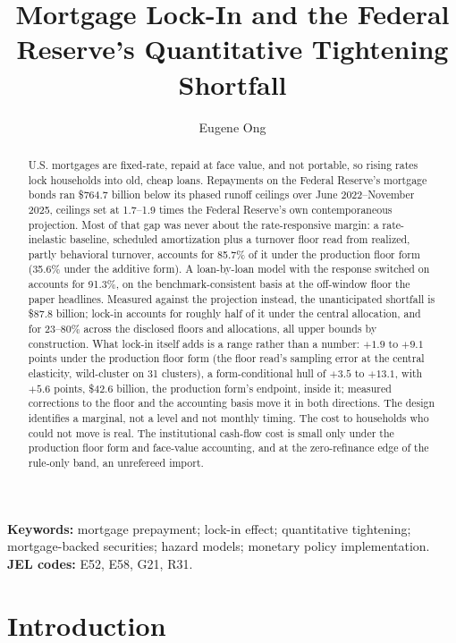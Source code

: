 \documentclass[12pt]{article}
\title{Mortgage Lock-In and the Federal Reserve's Quantitative Tightening Shortfall}
\author{Eugene Ong}
\affil{Carnegie Mellon University}
\date{}
\begin{document}
\maketitle
\begin{abstract}
\noindent U.S. mortgages are fixed-rate, repaid at face value, and not portable, so rising rates lock households into old, cheap loans. Repayments on the Federal Reserve's mortgage bonds ran \$764.7 billion below its phased runoff ceilings over June 2022--November 2025, ceilings set at 1.7--1.9 times the Federal Reserve's own contemporaneous projection. Most of that gap was never about the rate-responsive margin: a rate-inelastic baseline, scheduled amortization plus a turnover floor read from realized, partly behavioral turnover, accounts for 85.7\% of it under the production floor form (35.6\% under the additive form). A loan-by-loan model with the response switched on accounts for 91.3\%, on the benchmark-consistent basis at the off-window floor the paper headlines. Measured against the projection instead, the unanticipated shortfall is \$87.8 billion; lock-in accounts for roughly half of it under the central allocation, and for 23--80\% across the disclosed floors and allocations, all upper bounds by construction. What lock-in itself adds is a range rather than a number: $+1.9$ to $+9.1$ points under the production floor form (the floor read's sampling error at the central elasticity, wild-cluster on 31 clusters), a form-conditional hull of $+3.5$ to $+13.1$, with $+5.6$ points, \$42.6 billion, the production form's endpoint, inside it; measured corrections to the floor and the accounting basis move it in both directions. The design identifies a marginal, not a level and not monthly timing. The cost to households who could not move is real. The institutional cash-flow cost is small only under the production floor form and face-value accounting, and at the zero-refinance edge of the rule-only band, an unrefereed import.
\end{abstract}

\vspace{0.5\baselineskip}
{\footnotesize\noindent\textbf{Keywords:} mortgage prepayment; lock-in effect; quantitative tightening; mortgage-backed securities; hazard models; monetary policy implementation.\\
\textbf{JEL codes:} E52, E58, G21, R31.\par}
\newpage
\section{Introduction}\label{sec:intro}
\end{document}

